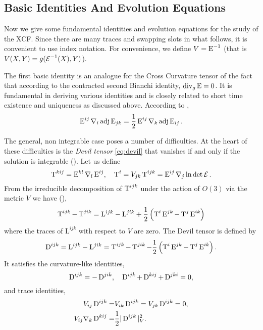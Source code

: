 \documentclass[a4paper,12pt]{amsart}
\begin{document}
\subsection{Basic Identities And Evolution Equations}
\label{subsec:xcf_identities}

Now we give some fundamental identities and evolution equations for the study of the XCF. Since there are many traces and swapping slots in what follows, it is convenient to use index notation. For convenience, we define \(V = \operatorname{E}^{-1}\) (that is \(V(X, Y) = g(\operatorname{\mathcal{E}}^{-1} (X), Y)\)).

The first basic identity is an analogue for the Cross Curvature tensor of the fact that according to the contracted second Bianchi identity, \(\operatorname{div}_g \operatorname{E} = 0\). It is fundamental in deriving various identities and is closely related to short time existence and uniqueness as discussed above. According to \cite[Lemma 1 (b)]{MR2055396},
\begin{equation}
\label{eq:xcf_integ}
\operatorname{E}^{ij} \nabla_i \operatorname{adj}\operatorname{E}_{jk} = \frac{1}{2} \operatorname{E}^{ij} \nabla_k \operatorname{adj}\operatorname{E}_{ij}.
\end{equation}

The general, non integrable case poses a number of difficulties. At the heart of these difficulties is the \emph{Devil tensor} \eqref{eq:devil} that vanishes if and only if the solution is integrable (). Let us define
\begin{equation}
\label{eq:T}
\operatorname{T}^{kij} = \operatorname{E}^{kl}\nabla_l \operatorname{E}^{ij}, \quad \operatorname{T}^i = V_{jk}\operatorname{T}^{ijk} = \operatorname{E}^{ij}\nabla_j \ln\det\operatorname{\mathcal{E}}.
\end{equation}
From the irreducible decomposition of $\operatorname{T}^{ijk}$ under the action of \(O(3)\) via the metric \(V\) we have (\cite[p. 6]{MR2055396}),
\[
\operatorname{T}^{ijk}-\operatorname{T}^{jik} = \mathrm{L}^{ijk}-\mathrm{L}^{jik} + \frac{1}{2}\left(\operatorname{T}^i\operatorname{E}^{jk}-\operatorname{T}^j\operatorname{E}^{ik}\right)
\]
where the traces of $\mathrm{L}^{ijk}$ with respect to $V$ are zero. The Devil tensor is defined by
\begin{equation}
\label{eq:devil}
\operatorname{D}^{ijk}=\mathrm{L}^{ijk}-\mathrm{L}^{jik} = \operatorname{T}^{ijk}-\operatorname{T}^{jik} - \frac{1}{2}\left(\operatorname{T}^i\operatorname{E}^{jk}-\operatorname{T}^j\operatorname{E}^{ik}\right).
\end{equation}
It satisfies the curvature-like identities,
\[
\operatorname{D}^{ijk} = -\operatorname{D}^{jik},\quad \operatorname{D}^{ijk}+\operatorname{D}^{kij}+\operatorname{D}^{jki} = 0,
\]
and trace identities,
\begin{align*}
V_{ij}\operatorname{D}^{ijk}=&V_{ik}\operatorname{D}^{ijk}=V_{jk}\operatorname{D}^{ijk}=0,\\
V_{ij}\nabla_k\operatorname{D}^{kij}=&\frac{1}{2}|\operatorname{D}^{ijk}|_V^2.
\end{align*}
\end{document}
